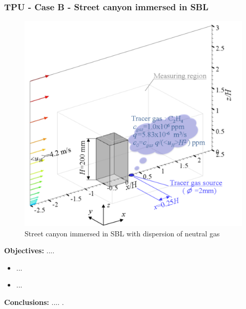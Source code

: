\subsubsection{TPU - Case B - Street canyon immersed in SBL}
    \begin{figure}[h!]
        \hypertarget{link:tpu_C}{}
        \centering
        \includegraphics[scale=0.6]{imgs/tpu_dataset_image.png}
        \caption{Street canyon immersed in SBL with dispersion of neutral 
        gas}
    \end{figure}
    \textbf{Objectives:} ....\newline
    \begin{itemize}
        \item ...
        \item ...
    \end{itemize}
    \textbf{Conclusions:} .... .\newline

